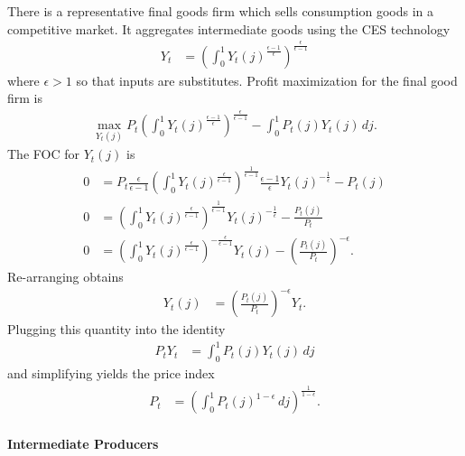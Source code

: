 \documentclass[12 pt, oneside]{article}
\theoremstyle{definition}
\theoremstyle{definition}
\theoremstyle{definition}
\begin{document}
There is a representative final goods firm which sells consumption goods in a competitive market.
It aggregates intermediate goods using the CES technology
\begin{align}
  Y_t & = \left(\int_0^1 Y_t(j)^{ \frac{\epsilon - 1}{\epsilon}}\right)^{\frac{\epsilon}{\epsilon - 1}}
\end{align}
where $\epsilon > 1$ so that inputs are substitutes. Profit maximization for the final good firm is
\begin{align}
  \max_{Y_t(j)} P_t\left(\int_0^1 Y_t(j)^{ \frac{\epsilon - 1}{\epsilon}}\right)^{\frac{\epsilon}{\epsilon - 1}} - \int_0^1 P_t(j) Y_t(j)\, dj.
\end{align}
The FOC for $Y_t(j)$ is
\begin{align*}
  0 & = P_t\frac{\epsilon}{\epsilon - 1}\left(\int_0^1 Y_t(j)^{\frac{\epsilon}{\epsilon - 1}}\right)^{\frac{1}{\epsilon - 1}}\frac{\epsilon - 1}{\epsilon} Y_t(j)^{-\frac{1}{\epsilon}} - P_t(j)\\
  0 & = \left(\int_0^1 Y_t(j)^{\frac{\epsilon}{\epsilon - 1}}\right)^{\frac{1}{\epsilon - 1}}Y_t(j)^{-\frac{1}{\epsilon}} - \frac{P_t(j)}{P_t}\\
  0 & = \left(\int_0^1 Y_t(j)^{\frac{\epsilon}{\epsilon - 1}}\right)^{-\frac{\epsilon}{\epsilon - 1}}Y_t(j) - \left(\frac{P_t(j)}{P_t}\right)^{-\epsilon}.
\end{align*}
Re-arranging obtains
\begin{align}
    Y_t(j) & =  \left(\frac{P_t(j)}{P_t}\right)^{-\epsilon} Y_t.
\end{align}
Plugging this quantity into the identity
\begin{align*}
  P_tY_t & = \int_0^1 P_t(j) Y_t(j)\, dj
\end{align*}
and simplifying yields the price index
\begin{align}
  P_t & = \left(\int_0^1 P_t(j)^{1 - \epsilon}\, dj\right)^{\frac{1}{1 - \epsilon}}.
\end{align}

\paragraph{Intermediate Producers}
\end{document}
